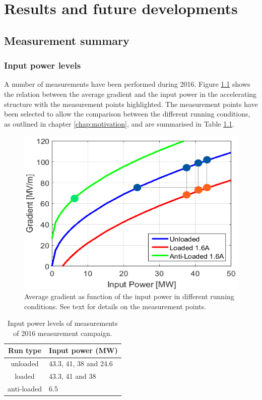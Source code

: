 \chapter[Results and future developments]{Results and future developments}
\label{chap:results}

\section[Measurement  summary]{Measurement summary}

\subsection[Input power levels]{Input power levels}

A number of measurements have been performed during 2016. Figure \ref{g_IP} shows the relation between the average gradient and the input power in the accelerating structure with the measurement points highlighted. The measurement points have been selected to allow the comparison between the different running conditions, as outlined in chapter \ref{chap:motivation}, and are summarised in Table \ref{run_pwr}.

\begin{figure}[h]
\centering 
\includegraphics[scale=0.7]{pictures/grad_vs_inPow.png}
\caption{Average gradient as function of the input power in different running conditions. See text for details on the measurement points. }
\label{g_IP}
\end{figure}



\begin{table}
  \centering
    \begin{tabular}{ c l }
    \hline
    \hline
    Run type		&	Input power (MW)		\\
    \hline
    unloaded 		&	43.3, 41, 38 and 24.6	\\
    loaded			&	43.3, 41 and 38			\\
    anti-loaded		&	6.5					\\
    \hline
    \hline
    \end{tabular}
\caption{Input power levels of measurements of 2016 measurement campaign.}
\label{run_pwr}
\end{table}

